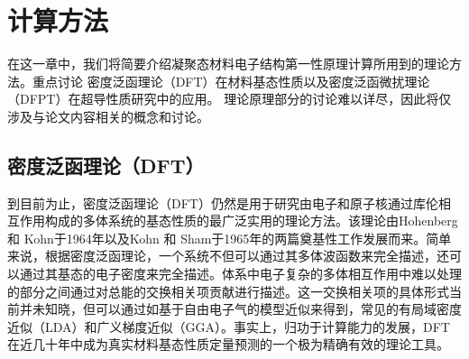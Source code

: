 \chapter{计算方法}\label{chapter_theory}
\newcommand{\ubm}[1]{\underline{\bm{#1}}}

在这一章中，我们将简要介绍凝聚态材料电子结构第一性原理计算所用到的理论方法。重点讨论
密度泛函理论（DFT）在材料基态性质以及密度泛函微扰理论（DFPT）在超导性质研究中的应用。
理论原理部分的讨论难以详尽，因此将仅涉及与论文内容相关的概念和讨论。

\section{密度泛函理论（DFT）}

到目前为止，密度泛函理论（DFT）仍然是用于研究由电子和原子核通过库伦相互作用构成的多体系统的基态性质的最广泛实用的理论方法。该理论由Hohenberg 和 Kohn\cite{hohenberg1964inhomogeneous}于1964年以及Kohn 和 Sham\cite{kohn1965self}于1965年的两篇奠基性工作发展而来。简单来说，根据密度泛函理论，一个系统不但可以通过其多体波函数来完全描述，还可以通过其基态的电子密度来完全描述。体系中电子复杂的多体相互作用中难以处理的部分之间通过对总能的交换相关项贡献进行描述。这一交换相关项的具体形式当前并未知晓，但可以通过如基于自由电子气的模型近似来得到，常见的有局域密度近似（LDA）和广义梯度近似（GGA）。事实上，归功于计算能力的发展，DFT在近几十年中成为真实材料基态性质定量预测的一个极为精确有效的理论工具。

